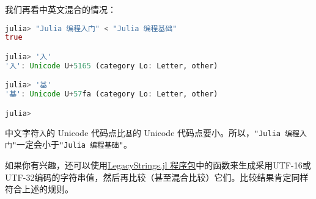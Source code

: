 我们再看中英文混合的情况：
\begin{lstlisting}[language=julia]
julia> "Julia 编程入门" < "Julia 编程基础"
true

julia> '入'
'入': Unicode U+5165 (category Lo: Letter, other)

julia> '基'
'基': Unicode U+57fa (category Lo: Letter, other)

julia> 
\end{lstlisting}

中文字符\verb|入|的 Unicode 代码点比\verb|基|的 Unicode 代码点要小。所以，\verb|"Julia 编程入门"|一定会小于\verb|"Julia 编程基础"|。

如果你有兴趣，还可以使用\href{https://github.com/JuliaStrings/LegacyStrings.jl}{LegacyStrings.jl 程序包}中的函数来生成采用UTF-16或UTF-32编码的字符串值，然后再比较（甚至混合比较）它们。比较结果肯定同样符合上述的规则。
